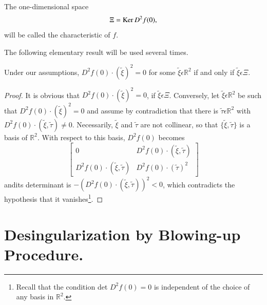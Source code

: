 \begin{definition}\label{chap5-def1.1}
The one-dimensional space
$$
\Xi = \operatorname{Ker} D^{2}f(0),
$$
will be called the characteristic of $f$.
\end{definition}

The following elementary result will be used several times.

\begin{lemma}\label{chap5-lem1.1}
Under our assumptions, $D^{2}f(0) \cdot (\widetilde{\xi})^{2} = 0$ for
some $\widetilde{\xi} \epsilon \mathbb{R}^{2}$ if and only if
$\widetilde{\xi} \epsilon \Xi$.
\end{lemma}

\begin{proof}
It is obvious that $D^{2}f(0) \cdot (\widetilde{\xi})^{2} = 0$, if
$\widetilde{\xi} \epsilon \Xi$. Conversely, let $\widetilde{\xi}
\epsilon \mathbb{R}^{2}$ be such that $D^{2}f(0) \cdot
(\widetilde{\xi})^{2} = 0$ and assume by contradiction that there is
$\widetilde{\tau} \epsilon \mathbb{R}^{2}$ with $D^{2}f(0) \cdot
(\widetilde{\xi}, \widetilde{\tau}) \neq 0$. Necessarily,
$\widetilde{\xi}$ and $\widetilde{\tau}$ are not collinear, so that
$\{\widetilde{\xi}, \widetilde{\tau}\}$ is a basis of
$\mathbb{R}^{2}$. With respect to this basis, $D^{2}f(0)$ becomes
\begin{equation*}
\begin{bmatrix}
0 & D^{2}f(0) \cdot (\widetilde{\xi}, \widetilde{\tau})\\
D^{2}f(0) \cdot (\widetilde{\xi}, \widetilde{\tau}) & D^{2}f(0) \cdot (\widetilde{\tau})^{2}
\end{bmatrix}
\end{equation*}
and\pageoriginale its determinant is $- (D^{2}f(0) \cdot
(\widetilde{\xi}, \widetilde{\tau}))^{2} < 0$, which contradicts the
hypothesis that it vanishes\footnote{Recall that the condition det
  $D^{2}f(0) = 0$ is independent of the choice of any basis in $\mathbb{R}^{2}$.}.
\end{proof}

\section{Desingularization by Blowing-up Procedure.}\label{chap5-sec2}

